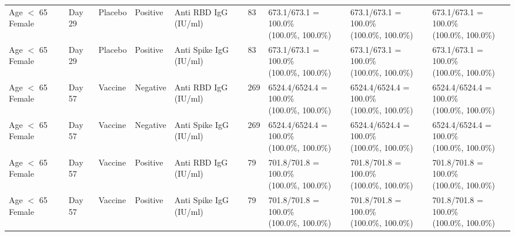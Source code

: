 \documentclass[]{book}
\theoremstyle{definition}
\theoremstyle{definition}
\theoremstyle{definition}
\newcommand{\1}{\mathbbm{1}}
\begin{document}
\begin{landscape}
\begin{ThreePartTable}
\begin{longtable}[t]{>{\raggedright\arraybackslash}p{2.7cm}llllllll}
\hspace{1em}Age $<$ 65 Female & Day 29 & Placebo & Positive & Anti RBD IgG (IU/ml) & 83 & \makecell[l]{673.1/673.1 = 100.0\%\\(100.0\%, 100.0\%)} & \makecell[l]{673.1/673.1 = 100.0\%\\(100.0\%, 100.0\%)} & \makecell[l]{673.1/673.1 = 100.0\%\\(100.0\%, 100.0\%)}\\
\hspace{1em}Age $<$ 65 Female & Day 29 & Placebo & Positive & Anti Spike IgG (IU/ml) & 83 & \makecell[l]{673.1/673.1 = 100.0\%\\(100.0\%, 100.0\%)} & \makecell[l]{673.1/673.1 = 100.0\%\\(100.0\%, 100.0\%)} & \makecell[l]{673.1/673.1 = 100.0\%\\(100.0\%, 100.0\%)}\\
\hspace{1em}Age $<$ 65 Female & Day 57 & Vaccine & Negative & Anti RBD IgG (IU/ml) & 269 & \makecell[l]{6524.4/6524.4 = 100.0\%\\(100.0\%, 100.0\%)} & \makecell[l]{6524.4/6524.4 = 100.0\%\\(100.0\%, 100.0\%)} & \makecell[l]{6524.4/6524.4 = 100.0\%\\(100.0\%, 100.0\%)}\\
\hspace{1em}Age $<$ 65 Female & Day 57 & Vaccine & Negative & Anti Spike IgG (IU/ml) & 269 & \makecell[l]{6524.4/6524.4 = 100.0\%\\(100.0\%, 100.0\%)} & \makecell[l]{6524.4/6524.4 = 100.0\%\\(100.0\%, 100.0\%)} & \makecell[l]{6524.4/6524.4 = 100.0\%\\(100.0\%, 100.0\%)}\\
\hspace{1em}Age $<$ 65 Female & Day 57 & Vaccine & Positive & Anti RBD IgG (IU/ml) & 79 & \makecell[l]{701.8/701.8 = 100.0\%\\(100.0\%, 100.0\%)} & \makecell[l]{701.8/701.8 = 100.0\%\\(100.0\%, 100.0\%)} & \makecell[l]{701.8/701.8 = 100.0\%\\(100.0\%, 100.0\%)}\\
\hspace{1em}Age $<$ 65 Female & Day 57 & Vaccine & Positive & Anti Spike IgG (IU/ml) & 79 & \makecell[l]{701.8/701.8 = 100.0\%\\(100.0\%, 100.0\%)} & \makecell[l]{701.8/701.8 = 100.0\%\\(100.0\%, 100.0\%)} & \makecell[l]{701.8/701.8 = 100.0\%\\(100.0\%, 100.0\%)}\\

\end{longtable}
\end{ThreePartTable}
\end{landscape}
\end{document}
